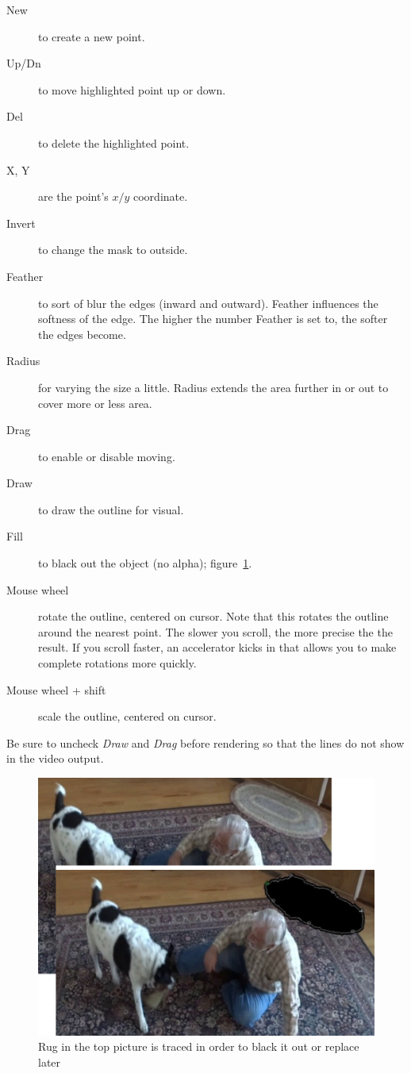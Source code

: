 {\begin{description}
	\item[New] to create a new point.
	\item[Up/Dn] to move highlighted point up or down.
	\item[Del] to delete the highlighted point.
	\item[X, Y] are the point’s $x/y$ coordinate.
	\item[Invert] to change the mask to outside.
	\item[Feather] to sort of blur the edges (inward and outward). Feather influences the softness of the edge. The higher the number Feather is set to, the softer the edges become.
	\item[Radius] for varying the size a little. Radius extends the area further in or out to cover more or less area.
	\item[Drag] to enable or disable moving.
	\item[Draw] to draw the outline for visual.
	\item[Fill] to black out the object (no alpha); figure~\ref{fig:tracer-02}.
	\item[Mouse wheel] rotate the outline, centered on cursor. Note that this rotates the outline around the nearest point. The slower you scroll, the more precise the the result. If you scroll faster, an accelerator kicks in that allows you to make complete rotations more quickly.
	\item[Mouse wheel + shift] scale the outline, centered on cursor.
\end{description}

Be sure to uncheck \textit{Draw} and \textit{Drag} before rendering so that the lines do not show in the video output.

\begin{figure}[hbtp]
	\centering
	\includegraphics[width=0.7\linewidth]{images/tracer-02.png}
	\caption{Rug in the top picture is traced in order to black it out or replace later}
	\label{fig:tracer-02}
\end{figure}

}
